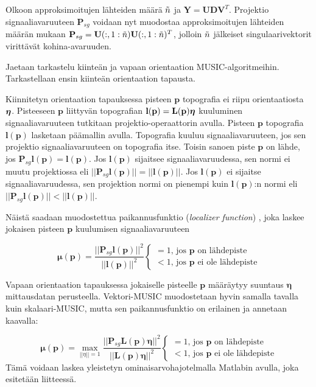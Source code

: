 Olkoon approksimoitujen lähteiden määrä $\Tilde{n}$ ja $\mathbf{Y=UDV}^T$. Projektio signaaliavaruuteen $\mathbf{P}_{sg}$ voidaan nyt muodostaa approksimoitujen lähteiden määrän mukaan $\mathbf{P}_{sg}=\mathbf{U}(:,1:\Tilde{n})\mathbf{U}(:,1:\Tilde{n})^T$, jolloin $\Tilde{n}$ jälkeiset singulaarivektorit virittävät kohina-avaruuden.

Jaetaan tarkastelu kiinteän ja vapaan orientaation MUSIC-algoritmeihin. Tarkastellaan ensin kiinteän orientaation tapausta.

Kiinnitetyn orientaation tapauksessa pisteen $\mathbf{p}$ topografia ei riipu orientaatiosta $\text{\boldmath$\eta$}$. Pisteeseen $\mathbf{p}$ liittyvän topografian $\mathbf{l(p) = L(p)\text{\boldmath$\eta$}}$ kuuluminen signaaliavaruuteen tutkitaan projektio-operaattorin avulla. Pisteen $\mathbf{p}$ topografia $\mathbf{l(p)}$ lasketaan päämallin avulla. Topografia kuuluu signaaliavaruuteen, jos sen projektio signaaliavaruuteen on topografia itse. Toisin sanoen piste $\mathbf{p}$ on lähde, jos $\mathbf{P}_{sg}\mathbf{l(p)} = \mathbf{l(p)}$. Jos $\mathbf{l(p)}$ sijaitsee signaaliavaruudessa, sen normi ei muutu projektiossa eli $||\mathbf{P}_{sg}\mathbf{l(p)}||=||\mathbf{l(p)}||$. Jos $\mathbf{l(p)}$ ei sijaitse signaaliavaruudessa, sen projektion normi on pienempi kuin $\mathbf{l(p)}$:n normi eli
$||\mathbf{P}_{sg}\mathbf{l(p)}||<||\mathbf{l(p)}||$. \citep{Makela2018TruncatedLocalization}

Näistä saadaan muodostettua paikannusfunktio (\textit{localizer function}) \citep{Makela2018TruncatedLocalization}, joka laskee jokaisen pisteen $\mathbf{p}$ kuulumisen signaaliavaruuteen

\begin{equation}
    \mathbf{\mu(p)} = \frac{||\mathbf{P}_{sg}\mathbf{l(p)}||^2}{||\mathbf{l(p)}||^2} 
    \begin{cases}
    =1\text{, jos $\mathbf{p}$ on lähdepiste}\\
    <1\text{, jos $\mathbf{p}$ ei ole lähdepiste}
     \end{cases}
\end{equation}

Vapaan orientaation tapauksessa jokaiselle pisteelle $\mathbf{p}$ määräytyy suuntaus $\mathbf{\eta}$ mittausdatan perusteella. Vektori-MUSIC muodostetaan hyvin samalla tavalla kuin skalaari-MUSIC, mutta sen paikannusfunktio on erilainen ja annetaan kaavalla:

\begin{equation}
    \mathbf{\mu(p)} = \max_{||\eta||=1} \frac{||\mathbf{P}_{sg}\mathbf{L(p)\eta}||^2}{||\mathbf{L(p)\eta}||^2}
    \begin{cases}
    =1\text{, jos $\mathbf{p}$ on lähdepiste}\\
    <1\text{, jos $\mathbf{p}$ ei ole lähdepiste}
     \end{cases}
\end{equation}
Tämä voidaan laskea yleistetyn ominaisarvohajotelmalla Matlabin avulla, joka esitetään liitteessä.